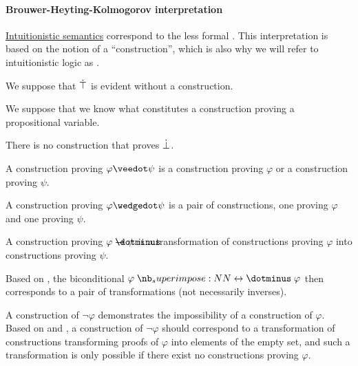 \paragraph{Brouwer-Heyting-Kolmogorov interpretation}

\begin{concept}\label{con:brouwer_heyting_kolmogorov_interpretation}
  \hyperref[def:propositional_semantics]{Intuitionistic semantics} correspond to the less formal . This interpretation is based on the notion of a \enquote{construction}, which is also why we will refer to intuitionistic logic as .

  \begin{thmenum}
     We suppose that \( \dot{\top} \) is evident without a construction.

     We suppose that we know what constitutes a construction proving a propositional variable.

     There is no construction that proves \( \dot{\bot} \).

     A construction proving \( \varphi \synvee \psi \) is a construction proving \( \varphi \) or a construction proving \( \psi \).

     A construction proving \( \varphi \synwedge \psi \) is a pair of constructions, one proving \( \varphi \) and one proving \( \psi \).

     A construction proving \( \varphi \synimplies \psi \) is a transformation of constructions proving \( \varphi \) into constructions proving \( \psi \).

     Based on , the biconditional \( \varphi \syniff \varphi \) then corresponds to a pair of transformations (not necessarily inverses).

     A construction of \( \neg \varphi \) demonstrates the impossibility of a construction of \( \varphi \). Based on  and , a construction of \( \neg \varphi \) should correspond to a transformation of constructions transforming proofs of \( \varphi \) into elements of the empty set, and such a transformation is only possible if there exist no constructions proving \( \varphi \).
  \end{thmenum}
\end{concept}

